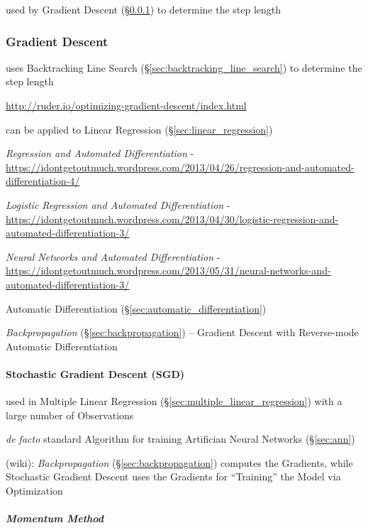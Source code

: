 {used by Gradient Descent (\S\ref{sec:gradient_descent}) to determine the step
length



\subsubsection{Gradient Descent}\label{sec:gradient_descent}

uses Backtracking Line Search (\S\ref{sec:backtracking_line_search}) to
determine the step length

\url{http://ruder.io/optimizing-gradient-descent/index.html}

can be applied to Linear Regression (\S\ref{sec:linear_regression})

\emph{Regression and Automated Differentiation} -
\url{https://idontgetoutmuch.wordpress.com/2013/04/26/regression-and-automated-differentiation-4/}

\emph{Logistic Regression and Automated Differentiation} -
\url{https://idontgetoutmuch.wordpress.com/2013/04/30/logistic-regression-and-automated-differentiation-3/}

\emph{Neural Networks and Automated Differentiation} -
\url{https://idontgetoutmuch.wordpress.com/2013/05/31/neural-networks-and-automated-differentiation-3/}

Automatic Differentiation (\S\ref{sec:automatic_differentiation})

\emph{Backpropagation} (\S\ref{sec:backpropagation}) -- Gradient Descent with
Reverse-mode Automatic Differentiation



\paragraph{Stochastic Gradient Descent (SGD)}\label{sec:sgd}\hfill

used in Multiple Linear Regression (\S\ref{sec:multiple_linear_regression}) with
a large number of Observations

\emph{de facto} standard Algorithm for training Artifician Neural Networks
(\S\ref{sec:ann})

(wiki): \emph{Backpropagation} (\S\ref{sec:backpropagation}) computes the
Gradients, while Stochastic Gradient Descent uses the Gradients for ``Training''
the Model via Optimization



\subparagraph{Momentum Method}\label{sec:momentum_method}\hfill

}
